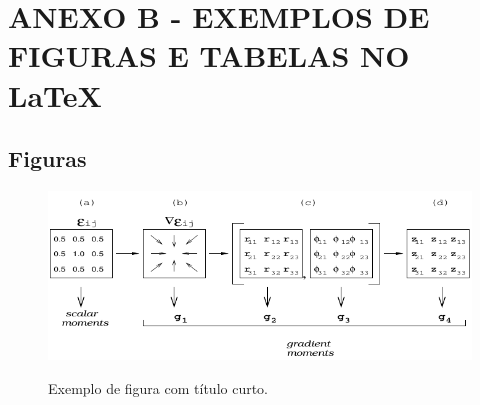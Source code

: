 \renewcommand{\thechapter}{}%
\chapter{ANEXO B - EXEMPLOS DE FIGURAS E TABELAS NO \LaTeX} %
\label{anexoB} %
\renewcommand{\thechapter}{B}%

\section{Figuras} %
\label{anexo2}

\begin{figure}[ht]
	\caption{Exemplo de figura com título curto.}
	\vspace{6mm}	%
	\begin{center}
    	\includegraphics[width=\mylenfig]{./Figuras2/gpa.pdf}  
	\end{center}
	\vspace{4mm}	%
	\label{figgpa1}
\end{figure}

